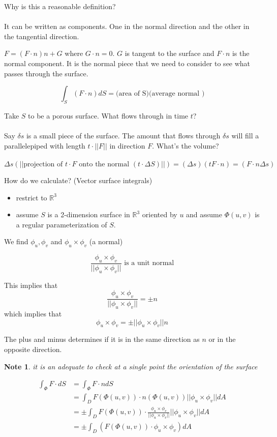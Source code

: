\documentclass[12pt]{article}
\theoremstyle{plain}
\newtheorem*{note}{Note}
\theoremstyle{definition}
\begin{document}
Why is this a reasonable definition?\\
\\
It can be written as components. One in the normal direction and the other in the tangential direction.

$F = (F \cdot n) n + G$ where $G \cdot n = 0$. $G$ is tangent to the surface and $F \cdot n$ is the normal component. It is the normal piece that we need to consider to see what passes through the surface.

$$\int_S (F \cdot n) dS = \text{(area of S)(average normal )}$$

Take $S$ to be a porous surface. What flows through in time $t$?\\
\\
Say $\delta s$ is a small piece of the surface. The amount that flows through $\delta s$ will fill a parallelepiped with length $t\cdot || F ||$ in direction $F$. What's the volume?\\
\\
$$\Delta s (||\text{projection of $t\cdot F$ onto the normal $(t\cdot \Delta S)$}||) = (\Delta s)(tF \cdot n) = (F \cdot n \Delta s)$$

How do we calculate? (Vector surface integrals)
\begin{itemize}
	\item{restrict to $\mathbb{R}^3$}
	\item{assume $S$ is a 2-dimension surface in $\mathbb{R}^3$ oriented by $u$ and assume $\Phi (u,v)$ is a regular parameterization of $S$.}
\end{itemize}
We find $\phi_u, \phi_v$ and $\phi_u \times \phi_v$ (a normal)

$$\frac{\phi_u \times \phi_v}{||\phi_u \times \phi_v||} \text{ is a unit normal}$$

This implies that
$$\frac{\phi_u \times \phi_v}{||\phi_u \times \phi_v||} = \pm n$$
which implies that
$$\phi_u \times \phi_v = \pm || \phi_u \times \phi_v|| n$$

The plus and minus determines if it is in the same direction as $n$ or in the opposite direction.

\begin{note}
	it is an adequate to check at a single point the orientation of the surface
\end{note}


\begin{align*}
	\int_\Phi F \cdot dS &= \int_\Phi F \cdot n dS\\
	&= \int_D F (\Phi (u,v)) \cdot n (\Phi(u,v)) || \phi_u \times \phi_v|| dA\\
	&= \pm \int_D F (\Phi (u,v)) \cdot \frac{\phi_u \times \phi_v}{||\phi_u \times \phi_v||} ||\phi_u \times \phi_v|| dA\\
	&= \pm \int_D (F(\Phi (u,v)) \cdot \phi_u \times \phi_v) dA
\end{align*}
\end{document}
